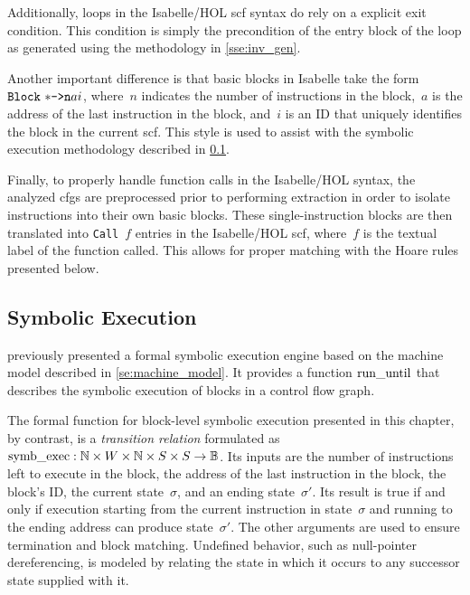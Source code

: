 Additionally, loops in the Isabelle/HOL \ac{scf} syntax
do rely on a explicit exit condition.
This condition is simply the precondition of the entry block of the loop
as generated using the methodology in \cref{sse:inv_gen}.

Another important difference is that basic blocks in Isabelle
take the form $\texttt{Block}~\mathtt{*\texttt{->}n}{a}{i}$,
where~$n$ indicates the number of instructions in the block,~$a$ is the address
of the last instruction in the block, and~$i$ is an ID
that uniquely identifies the block in the current \ac{scf}.
This style is used to assist with the symbolic execution methodology described in
\cref{sse:syntax_ver_symb}.

Finally, to properly handle function calls in the Isabelle/HOL syntax,
the analyzed \acp{cfg} are preprocessed prior to performing extraction
in order to isolate  instructions into their own basic blocks.
These single-instruction blocks are then translated into \texttt{Call}~$f$ entries
in the Isabelle/HOL \ac{scf}, where~$f$ is the textual label of the function called.
This allows for proper matching with the Hoare rules presented below.

\subsection{Symbolic Execution}\label{sse:syntax_ver_symb}
 previously presented a formal symbolic execution engine
based on the machine model described in \cref{se:machine_model}.
It provides a function $\operatorname{run\_until}$ that describes the symbolic execution of
blocks in a control flow graph.

The formal function for block-level symbolic execution presented in this chapter,%
by contrast, is a \emph{transition relation}%
 formulated as
$\operatorname{symb\_exec}:\mathbb{N}\times W\times\mathbb{N}\times S\times S\rightarrow\mathbb{B}$.%
%
Its inputs are the number of instructions left to execute in the block,
the address of the last instruction in the block, the block's ID,
the current state~$\sigma$, and an ending state~$\sigma'$.
Its result is true if and only if execution
starting from the current instruction in state~$\sigma$
and running to the ending address can produce state~$\sigma'$.
The other arguments are used to ensure termination and block matching.
Undefined behavior, such as null-pointer dereferencing,
is modeled by relating the state in which it occurs to any successor state
supplied with it.

